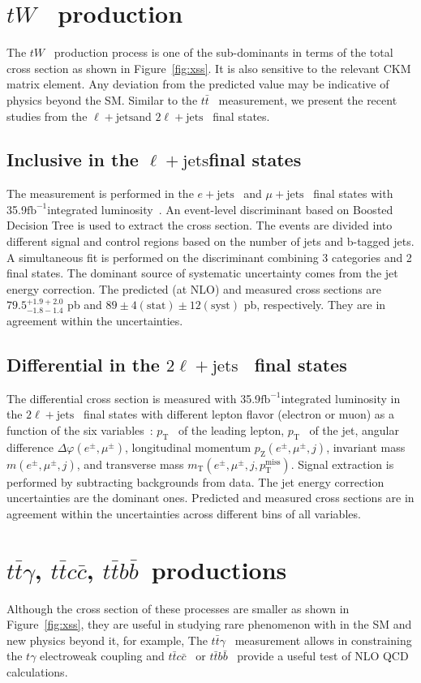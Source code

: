 \documentclass[submission, Proceedings]{SciPost}
\newcommand{\fbinv}{\ensuremath{{\text{fb}^{-1}}}{}}
\newcommand{\ptmiss}{\ensuremath{{p_\text{T}^{\text{miss}}}}}
\newcommand{\pt}{\ensuremath{{p_\text{T}}}}
\newcommand{\Pe}{\ensuremath{{e}}}
\newcommand{\PQt}{\ensuremath{{t}}}
\newcommand{\PAQt}{\ensuremath{{\bar{t}}}}
\newcommand{\PQb}{\ensuremath{{b}}}
\newcommand{\PAQb}{\ensuremath{{\bar{b}}}}
\newcommand{\PQc}{\ensuremath{{c}}}
\newcommand{\PAQc}{\ensuremath{{\bar{c}}}}
\newcommand{\ttbar}{{\PQt\PAQt}}
\newcommand{\PW}{\ensuremath{{W}}}
\newcommand{\Pepm}{\ensuremath{{e^\pm}}}
\newcommand{\PGmmp}{\ensuremath{{\mu^\pm}}}
\newcommand{\pzvar}{\ensuremath{p_\text{Z}(\Pepm, \PGmmp, j)}}
\newcommand{\invmassvar}{\ensuremath{m(\Pepm, \PGmmp,j)}}
\newcommand{\transmassvar}{\ensuremath{m_{\text{T}}(\Pepm, \PGmmp,j,\ptmiss)}}
\newcommand{\deltaPhiVar}{\ensuremath{\Delta\varphi(\Pepm, \PGmmp)}}
\newcommand{\ljets}{\ensuremath{\ell + \text{jets}}}
\newcommand{\dilep}{\ensuremath{2\ell + \text{jets}}}
\newcommand{\ttgamma}{\ensuremath{\ttbar\gamma}}
\newcommand{\ttcc}{{\ttbar\PQc\PAQc}}
\newcommand{\ttbb}{{\ttbar\PQb\PAQb}}
\newcommand{\mujets}{\ensuremath{\mu + \text{jets}}}
\newcommand{\ejets}{\ensuremath{\Pe + \text{jets}}}
\begin{document}
\section{\PQt\PW~ production} 
\label{sec:tW}
The \PQt\PW~ production process is one of the sub-dominants in terms of the total cross section as 
shown in Figure~\ref{fig:xss}. It is also sensitive to the relevant CKM matrix element. 
Any deviation from the predicted value may be indicative of physics beyond the SM. Similar to the 
\ttbar~ measurement, we present the recent studies from the \ljets and \dilep~ final states.

\subsection{Inclusive in the \ljets final states}
The measurement is performed in the \ejets~ and \mujets~ final states with 35.9\fbinv integrated
luminosity~\cite{CMS-PAS-TOP-20-002}. An event-level discriminant based on Boosted Decision Tree 
is used to extract the cross section. The events are divided into different signal and control 
regions based on the number of jets and b-tagged jets. A simultaneous fit is performed on the
discriminant combining 3 categories and 2 final states. The dominant source of systematic 
uncertainty comes from the jet energy correction. The predicted (at NLO) and 
measured cross sections are $79.5^{+1.9+2.0}_{-1.8-1.4}$ pb and 
$89 \pm 4 (\text{stat}) \pm 12 (\text{syst})$ pb, respectively. They are in agreement within the
uncertainties.

\subsection{Differential in the \dilep~ final states}
The differential cross section is measured with 35.9\fbinv integrated luminosity in the \dilep~ final
states with different lepton flavor (electron or muon) as a function of the six 
variables~\cite{CMS-PAS-TOP-19-003}: \pt~ of the leading lepton, \pt~ of the jet, angular difference
\deltaPhiVar, longitudinal momentum \pzvar, invariant mass \invmassvar, and transverse mass 
\transmassvar. Signal extraction is performed by subtracting backgrounds from data. The jet energy 
correction uncertainties are the dominant ones. Predicted and measured cross sections are in 
agreement within the uncertainties across different bins of all variables.

\section{\ttgamma, \ttcc, \ttbb~productions}
\label{sec:ttX}
Although the cross section of these processes are smaller as shown in Figure~\ref{fig:xss},
they are useful in studying rare phenomenon with in the SM and new physics beyond it, for example,
The \ttgamma~ measurement allows in constraining the $\PQt\gamma$ electroweak coupling and \ttcc~ or
\ttbb~ provide a useful test of NLO QCD calculations. 
\end{document}
